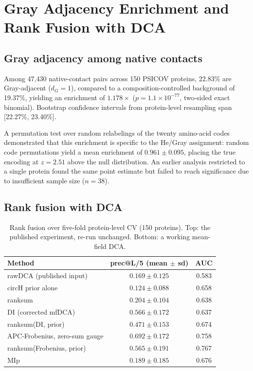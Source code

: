 \section{Gray Adjacency Enrichment and Rank Fusion with DCA}
\label{sec:res-gray-fusion}

\subsection{Gray adjacency among native contacts}

Among 47{,}430 native-contact pairs across 150 PSICOV proteins, 22.83\% are
Gray-adjacent ($d_G = 1$), compared to a composition-controlled background of
19.37\%, yielding an enrichment of $1.178\times$ ($p = 1.1 \times 10^{-77}$,
two-sided exact binomial).  Bootstrap confidence intervals from protein-level
resampling span [22.27\%, 23.40\%].

A permutation test over random relabelings of the twenty amino-acid codes
demonstrated that this enrichment is specific to the He/Gray assignment:
random code permutations yield a mean enrichment of $0.961 \pm 0.095$, placing
the true encoding at $z = 2.51$ above the null distribution.  An earlier
analysis restricted to a single protein found the same point estimate but
failed to reach significance due to insufficient sample size ($n = 38$).

\subsection{Rank fusion with DCA}

\begin{table}[ht]
	\centering
	\caption{Rank fusion over five-fold protein-level CV (150 proteins).  Top:
		the published experiment, re-run unchanged.  Bottom: a working mean-field DCA.}
	\label{tab:fusion-nat}
	\begin{tabular}{lcc}
		\toprule
		Method                          & prec@L/5 (mean $\pm$ sd)   & AUC   \\
		\midrule
		rawDCA (published input)        & $0.169 \pm 0.125$          & 0.583 \\
		circH prior alone               & $0.124 \pm 0.088$          & 0.658 \\
		ranksum                         & $0.204 \pm 0.104$          & 0.638 \\
		\midrule
		DI (corrected mfDCA)            & $0.566 \pm 0.172$          & 0.637 \\
		\quad ranksum(DI, prior)        & $0.471 \pm 0.153$          & 0.674 \\
		APC-Frobenius, zero-sum gauge   & $\mathbf{0.692 \pm 0.172}$ & 0.758 \\
		\quad ranksum(Frobenius, prior) & $0.565 \pm 0.191$          & 0.767 \\
		MIp                             & $0.189 \pm 0.185$          & 0.676 \\
		\bottomrule
	\end{tabular}
\end{table}

